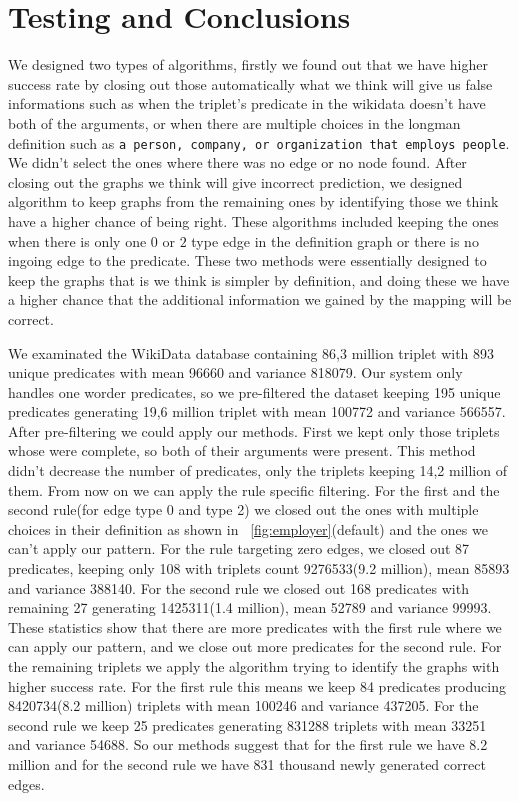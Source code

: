 \documentclass[twoside,b5paper,10pt]{article}
\begin{document}
\section{Testing and Conclusions}
\label{sec:Testing}
We designed two types of algorithms, firstly we found out that we have higher success rate by closing out those automatically what we think
will give us false informations such as when the triplet's predicate in the wikidata doesn't have both of the arguments, or when there are multiple
choices in the longman definition such as \texttt{a person, company, or organization that employs people}. We didn't select the ones where there was no edge or no node found.
After closing out the graphs we think will give incorrect prediction, we designed algorithm to keep graphs from the remaining ones by identifying those we think have a higher chance of being right.
These algorithms included keeping the ones when there is only one $0$ or $2$ type edge in the definition graph or there is no ingoing edge
to the predicate. These two methods were essentially designed to keep the graphs that is we think is simpler by definition, and doing these
we have a higher chance that the additional information we gained by the mapping will be correct.

We examinated the WikiData database containing 86,3 million triplet with 893 unique predicates with mean 96660 and variance 818079.
Our system only handles one worder predicates, so we pre-filtered the dataset keeping 195 unique predicates generating 19,6 million triplet
with mean 100772 and variance 566557. After pre-filtering we could apply our methods. First we kept only those triplets whose were complete, so both of their arguments were present.
This method didn't decrease the number of predicates, only the triplets keeping 14,2 million of them. From now on we can apply the rule specific filtering.
For the first and the second rule(for edge type 0 and type 2) we closed out the ones with multiple choices in their definition as shown in \figurename~\ref{fig:employer}(default) and the ones we can't apply our pattern.
For the rule targeting zero edges, we closed out 87 predicates, keeping only 108 with triplets count 9276533(9.2 million), mean 85893 and variance 388140.
For the second rule we closed out 168 predicates with remaining 27 generating 1425311(1.4 million), mean 52789 and variance 99993. These statistics show that
there are more predicates with the first rule where we can apply our pattern, and we close out more predicates for the second rule. For the remaining triplets
we apply the algorithm trying to identify the graphs with higher success rate. For the first rule this means we keep 84 predicates producing 8420734(8.2 million) triplets with mean 100246
and variance 437205. For the second rule we keep 25 predicates generating 831288 triplets with mean 33251 and variance 54688. So our methods suggest that 
for the first rule we have 8.2 million and for the second rule we have 831 thousand newly generated correct edges. 
\end{document}
